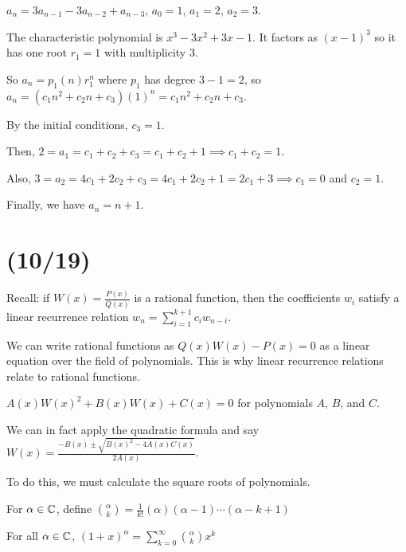 \begin{example}
  $a_n = 3a_{n-1} - 3a_{n-2} + a_{n-3}$, $a_0 = 1$, $a_1 = 2$, $a_2 = 3$.
\end{example}
\begin{sol}
  The characteristic polynomial is $x^3 - 3x^2 + 3x - 1$.
  It factors as $(x-1)^3$ so it has one root $r_1 = 1$ with multiplicity 3.

  So $a_n = p_1(n) r_1^n$ where $p_1$ has degree $3-1=2$,
  so $a_n = (c_1 n^2 + c_2 n + c_3)(1)^n = c_1 n^2 + c_2 n + c_3$.

  By the initial conditions, $c_3 = 1$.

  Then, $2 = a_1 = c_1 + c_2 + c_3 = c_1 + c_2 + 1 \implies c_1 + c_2 = 1$.

  Also, $3 = a_2 = 4c_1 + 2c_2 + c_3 = 4c_1 + 2c_2 + 1 = 2c_1 + 3 \implies c_1 = 0$
  and $c_2 = 1$.

  Finally, we have $a_n = n + 1$.
\end{sol}

\section{(10/19)}

Recall: if $W(x) = \frac{P(x)}{Q(x)}$ is a rational function,
then the coefficients $w_i$ satisfy a linear recurrence relation
$w_n = \sum_{i=1}^{k+1}c_iw_{n-i}$.

We can write rational functions as $Q(x)W(x) - P(x) = 0$
as a linear equation over the field of polynomials.
This is why linear recurrence relations relate to rational functions.

\begin{defn}
  $A(x)W(x)^2 + B(x)W(x) + C(x) = 0$
  for polynomials $A$, $B$, and $C$.
\end{defn}

We can in fact apply the quadratic formula
and say $W(x) = \frac{-B(x)\pm\sqrt{B(x)^2-4A(x)C(x)}}{2A(x)}$.

To do this, we must calculate the square roots of polynomials.

\begin{defn}
  For $\alpha \in \mathbb{C}$, define $\binom{\alpha}{k} = \frac{1}{k!}(\alpha)(\alpha-1)\dotsb(\alpha-k+1)$
\end{defn}

\begin{theorem}\label{thm:genbin}
  For all $\alpha \in \mathbb{C}$,
  $(1+x)^\alpha = \sum\limits_{k=0}^\infty \binom{\alpha}{k}x^k$
\end{theorem}

